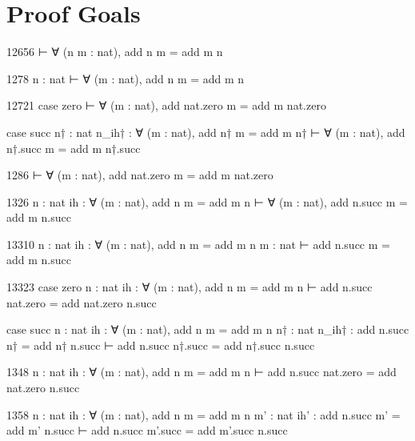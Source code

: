 \section{Proof Goals}

\begin{leanProofGoal}{126}{56}
⊢ ∀ (n m : nat), add n m = add m n
\end{leanProofGoal} 

\begin{leanProofGoal}{127}{8}
n : nat
⊢ ∀ (m : nat), add n m = add m n
\end{leanProofGoal} 

\begin{leanProofGoal}{127}{21}
case zero
⊢ ∀ (m : nat), add nat.zero m = add m nat.zero

case succ
n† : nat
n_ih† : ∀ (m : nat), add n† m = add m n†
⊢ ∀ (m : nat), add n†.succ m = add m n†.succ
\end{leanProofGoal} 

\begin{leanProofGoal}{128}{6}
⊢ ∀ (m : nat), add nat.zero m = add m nat.zero
\end{leanProofGoal} 

\begin{leanProofGoal}{132}{6}
n : nat
ih : ∀ (m : nat), add n m = add m n
⊢ ∀ (m : nat), add n.succ m = add m n.succ
\end{leanProofGoal} 

\begin{leanProofGoal}{133}{10}
n : nat
ih : ∀ (m : nat), add n m = add m n
m : nat
⊢ add n.succ m = add m n.succ
\end{leanProofGoal} 

\begin{leanProofGoal}{133}{23}
case zero
n : nat
ih : ∀ (m : nat), add n m = add m n
⊢ add n.succ nat.zero = add nat.zero n.succ

case succ
n : nat
ih : ∀ (m : nat), add n m = add m n
n† : nat
n_ih† : add n.succ n† = add n† n.succ
⊢ add n.succ n†.succ = add n†.succ n.succ
\end{leanProofGoal} 

\begin{leanProofGoal}{134}{8}
n : nat
ih : ∀ (m : nat), add n m = add m n
⊢ add n.succ nat.zero = add nat.zero n.succ
\end{leanProofGoal} 

\begin{leanProofGoal}{135}{8}
n : nat
ih : ∀ (m : nat), add n m = add m n
m' : nat
ih' : add n.succ m' = add m' n.succ
⊢ add n.succ m'.succ = add m'.succ n.succ
\end{leanProofGoal} 